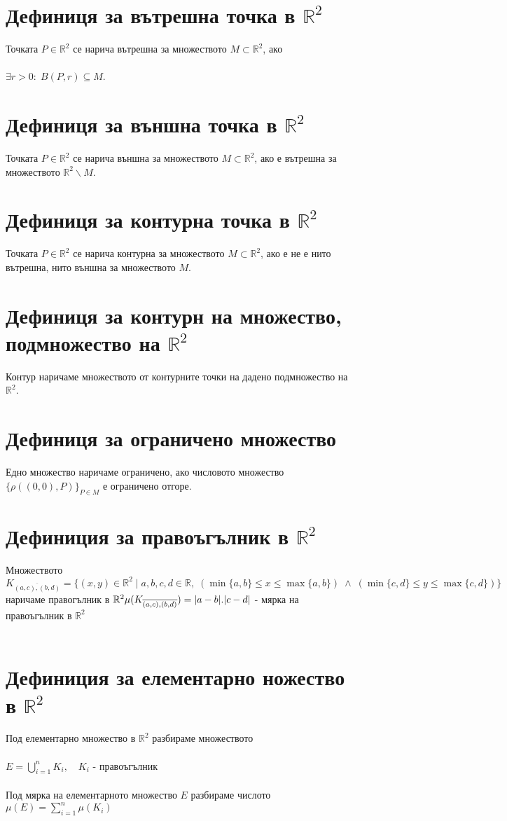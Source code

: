 \documentclass[14pt]{extarticle}
\newcommand{\R}{\mathbb{R}}
\newcommand{\Sum}{\displaystyle\sum}
\begin{document}
\section*{Дефиниця за вътрешна точка в \(\R^2\)}
Точката \(P \in \R^2\) се нарича вътрешна за множеството \(M \subset \R^2\), ако \\\\
\(\exists r > 0 : \; B(P,r) \subseteq M\).
\section*{Дефиниця за външна точка в \(\R^2\)}
Точката \(P \in \R^2\) се нарича външна за множеството \(M \subset \R^2\), ако е вътрешна за множеството \(\R^2\backslash M\).
\section*{Дефиниця за контурна точка в \(\R^2\)}
Точката \(P \in \R^2\) се нарича контурна за множеството \(M \subset \R^2\), ако е не е нито вътрешна, нито външна за множеството \(M\).
\section*{Дефиниця за контурн на множество, подмножество на \(\R^2\)}
Контур наричаме множеството от контурните точки на дадено подмножество на \(\R^2\).
\section*{Дефиниця за ограничено множество}
Едно множество наричаме ограничено, ако числовото множество \(\{\rho((0, 0), P)\}_{P \in M}\) е ограничено отгоре.
\section*{Дефиниция за правоъгълник в \(\R^2\)}
Множеството \(K_{\overline{(a, c), (b, d)}} = \{(x, y) \in \R^2 \; | \; a, b, c, d \in \R, \;  (\min\{a, b\} \leq x \leq \max\{a, b\}) \; \land \; (\min\{c, d\} \leq y \leq \max\{c, d\}) \}\) наричаме правогълник в \(\R^2 \\\\
\mu(K_{\overline{(a, c), (b, d)}}) = |a - b|.|c - d|\) - мярка на правоъгълник в \(\R^2\) \\\\
\section*{Дефиниция за елементарно ножество в \(\R^2\)}
Под елементарно множество в \(\R^2\) разбираме множеството \\\\
\(E = \bigcup_{i = 1}^n K_i, \quad K_i\) - правоъгълник \\\\
Под мярка на елементарното множество \(E\) разбираме числото \(\mu(E) = \Sum_{i = 1}^n \mu(K_i)\)
\end{document}
